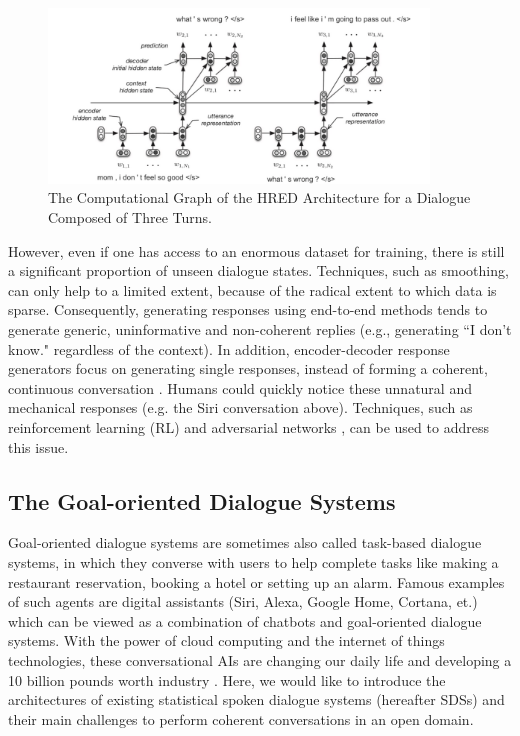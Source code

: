 \documentclass[bsc,frontabs,twoside,singlespacing,parskip,deptreport]{infthesis}     %
\begin{document}
\begin{figure}[h]
    \centering
    \includegraphics[width=0.9\textwidth]{HERD.jpeg}
    \caption{The Computational Graph of the HRED Architecture for a Dialogue Composed of Three Turns.}
    \label{fig:HERD}
\end{figure}

However, even if one has access to an enormous dataset for training, there is still a significant proportion of unseen dialogue states. Techniques, such as smoothing, can only help to a limited extent, because of the radical extent to which data is sparse. Consequently, generating responses using end-to-end methods tends to generate generic, uninformative and non-coherent replies (e.g., generating ``I don’t know." regardless of the context). In addition, encoder-decoder response generators focus on generating single responses, instead of forming a coherent, continuous conversation \cite{jurafsky2019speech}. Humans could quickly notice these unnatural and mechanical responses (e.g. the Siri conversation above). Techniques, such as reinforcement learning (RL) \cite{li2016deep} and adversarial networks \cite{li2017adversarial}, can be used to address this issue.

\subsection{The Goal-oriented Dialogue Systems}

 Goal-oriented dialogue systems are sometimes also called task-based dialogue systems, in which they converse with users to help complete tasks like making a restaurant reservation, booking a hotel or setting up an alarm. Famous examples of such agents are digital assistants (Siri, Alexa, Google Home, Cortana, et.) \cite{siri,alexa,googlehome,cortana} which can be viewed as a combination of chatbots and goal-oriented dialogue systems. With the power of cloud computing and the internet of things technologies, these conversational AIs are changing our daily life and developing a 10 billion pounds worth industry \cite{chatbotmarket}. Here, we would like to introduce the architectures of existing statistical spoken dialogue systems (hereafter SDSs) and their main challenges to perform coherent conversations in an open domain. 
\end{document}
